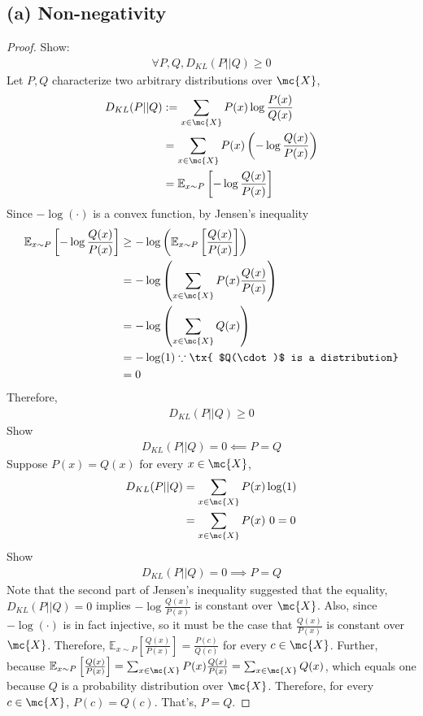 \documentclass[11pt]{article}
\begin{document}
	\subsection{(a) Non-negativity}
	\begin{proof}
		Show:
		\begin{align}
			\forall P, Q, D_{KL}(P||Q) \geq 0
		\end{align}
		Let $P, Q$ characterize two arbitrary distributions over $\mc{X}$,
		\begin{align}
			D_{KL}(P||Q) &:= \sum_{x \in \mc{X}} P(x) \log \frac{P(x)}{Q(x)} \\
			&= \sum_{x \in \mc{X}} P(x) \left(-\log \frac{Q(x)}{P(x)} \right)\\
			&= \mathbb{E}_{x \sim P} \left [
			- \log \frac{Q(x)}{P(x)}
			\right ]
		\end{align}
		Since $-\log(\cdot)$ is a convex function, by Jensen's inequality
		\begin{align}
			\mathbb{E}_{x \sim P} \left [
			- \log \frac{Q(x)}{P(x)}
			\right ] &\geq -\log \left (
			\mathbb{E}_{x \sim P} \left [
			\frac{Q(x)}{P(x)}
			\right]
			\right ) \\
			&= - \log \left(
			\sum_{x \in \mc{X}}P(x) \frac{Q(x)}{P(x)}
			\right ) \\
			&= - \log \left(
			\sum_{x \in \mc{X}}Q(x)
			\right ) \\
			&= - \log(1) \because \tx{ $Q(\cdot)$ is a distribution} \\
			&= 0
		\end{align}
		Therefore,
		\begin{align}
			D_{KL}(P||Q) \geq 0
		\end{align}
		Show 
		\begin{align}
			D_{KL}(P||Q) = 0 \impliedby P = Q
		\end{align}
		Suppose $P(x) = Q(x)$ for every $x \in \mc{X}$,
		\begin{align}
			D_{KL}(P||Q) &= \sum_{x \in \mc{X}} P(x) \log(1) \\
			&= \sum_{x \in \mc{X}} P(x)\ 0 = 0
		\end{align}
		Show
		\begin{align}
			D_{KL}(P||Q) = 0 \implies P = Q
		\end{align}
		Note that the second part of Jensen's inequality suggested that the equality, $D_{KL}(P||Q) = 0$ implies $-\log \frac{Q(x)}{P(x)}$ is constant over $\mc{X}$. Also, since $-\log(\cdot)$ is in fact injective, so it must be the case that $\frac{Q(x)}{P(x)}$ is constant over $\mc{X}$. Therefore, $\mathbb{E}_{x \sim P} \left [\frac{Q(x)}{P(x)} \right] = \frac{P(c)}{Q(c)}$ for every $c \in \mc{X}$. Further, because $\mathbb{E}_{x \sim P} \left [\frac{Q(x)}{P(x)} \right] = \sum_{x \in \mc{X}} P(x) \frac{Q(x)}{P(x)} = \sum_{x \in \mc{X}} Q(x)$, which equals one because $Q$ is a probability distribution over $\mc{X}$. Therefore, for every $c \in \mc{X}$, $P(c) = Q(c)$. That's, $P = Q$.
		
	\end{proof}
	
\end{document}
